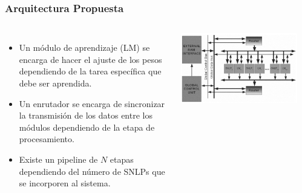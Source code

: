 \frame
{
\frametitle{Arquitectura Propuesta}
\begin{columns}
   \begin{itemize}
   \item Un módulo de aprendizaje (LM) se encarga de hacer el ajuste de los pesos dependiendo de la tarea específica que debe ser aprendida.
   \item Un enrutador se encarga de sincronizar la transmisión de los datos entre los módulos dependiendo de la etapa de procesamiento.
   \item Existe un pipeline de $N$ etapas dependiendo del número de SNLPs que se incorporen al sistema.
    \end{itemize} 
    \includegraphics[width=0.9\textwidth]{Figs/2009_BackPropagationFF01}
\end{columns}
}




